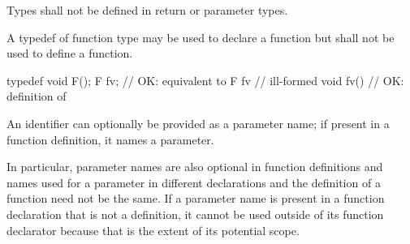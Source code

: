 \pnum
Types shall not be defined in return or parameter types.

\pnum
{}%
A typedef of function type may be used to declare a function but shall not be
used to define a function.
\begin{example}
\begin{codeblock}
typedef void F();
F  fv;              // OK: equivalent to 
F  fv { }           // ill-formed
void fv() { }       // OK: definition of 
\end{codeblock}
\end{example}

\pnum
An identifier can optionally be provided as a parameter name;
if present in a function definition, it names a parameter.
\begin{note}
In particular, parameter names are also optional in function definitions
and names used for a parameter in different declarations and the definition
of a function need not be the same.
If a parameter name is present in a function declaration that is not a definition,
it cannot be used outside of
its function declarator because that is the extent of its potential scope.
\end{note}

